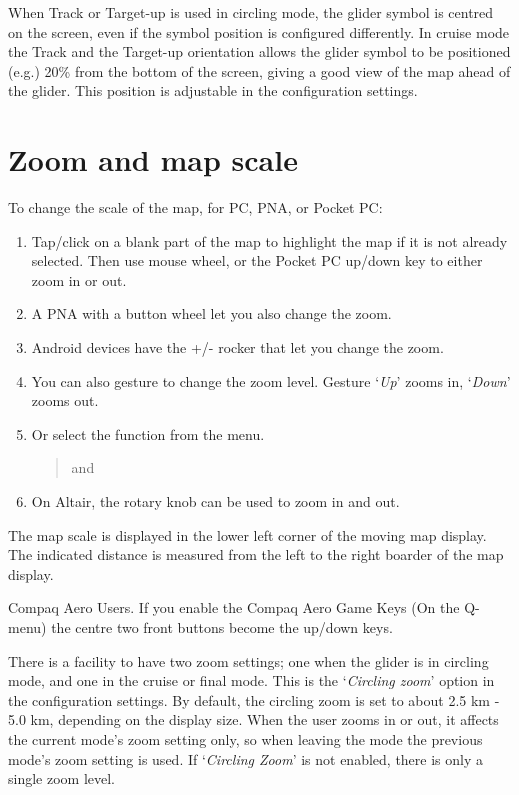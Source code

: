 When Track or Target-up is used in circling mode, the glider symbol is
centred on the screen, even if the symbol position is configured differently.
In cruise mode the Track and the Target-up orientation allows the glider
symbol to be positioned (e.g.) 20\% from the bottom of the screen, giving a good view of the
map ahead of the glider.  This position is adjustable in the configuration
 settings.

\section{Zoom and map scale}\label{sec:zooming}

To change the scale of the map, for PC, PNA, or Pocket PC:
\begin{enumerate}
\item Tap/click on a blank part of the map to highlight the map if it is not
already selected.
Then use mouse wheel, or the Pocket PC up/down key to either zoom
in or out.
\item A PNA with a button wheel let you also change the zoom.
\item Android devices have the +/- rocker that let you change the zoom.
\item You can also gesture to change the zoom level. Gesture
`{\it Up}' zooms in, `{\it Down}' zooms out.
\item Or select the function from the menu.
\begin{quote}
\blink{} and 
\end{quote}
\item On Altair, the rotary knob can be used to zoom in and out.
\end{enumerate}

The map scale is displayed in the lower left corner of the moving map
display. The indicated distance is measured from the left to the right boarder
of the map display.

Compaq Aero Users. If you enable the Compaq Aero Game Keys (On the
Q-menu) the centre two front buttons become the up/down keys.

There is a facility to have two zoom settings; one when the glider is
in circling mode, and one in the cruise or final mode.  This is the `{\it Circling zoom}'
option in the  configuration settings.
By default, the circling zoom is set to about 2.5 km - 5.0 km, depending on the
display size. When the user zooms in or out, it affects the current
mode's zoom setting only, so when leaving the mode the previous mode's
zoom setting is used.  If `{\it Circling Zoom}' is not enabled,
there is only a single zoom level.


